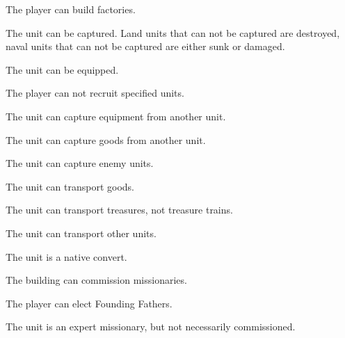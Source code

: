 \documentclass[12pt]{book}
\begin{document}
\affectsPlayer

The player can build factories.

\affectsUnit

The unit can be captured. Land units that can not be captured are
destroyed, naval units that can not be captured are either sunk or
damaged.

\affectsUnit

The unit can be equipped.

\affectsPlayer

The player can not recruit specified units.

\affectsUnit

The unit can capture equipment from another unit.

\affectsUnit

The unit can capture goods from another unit.

\affectsUnit

The unit can capture enemy units.

\affectsUnit

The unit can transport goods.

\affectsUnit

The unit can transport treasures, not treasure trains.

\affectsUnit

The unit can transport other units.

\affectsUnit

The unit is a native convert.

\affectsBuilding

The building can commission missionaries.

\affectsPlayer

The player can elect Founding Fathers.

\affectsUnit

The unit is an expert missionary, but not necessarily commissioned.

\affectsUnit
\end{document}

